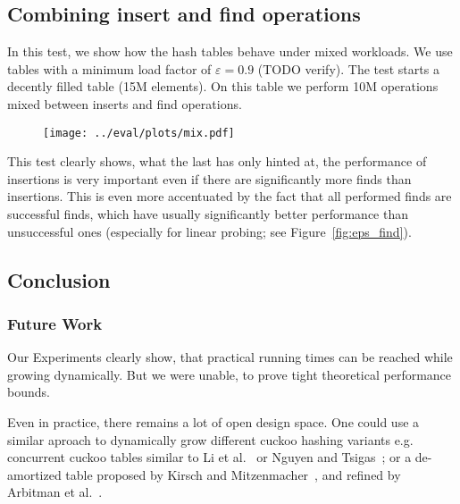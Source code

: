 \documentclass[a4paper,UKenglish]{lipics-v2016}
\begin{document}
\subsection{Combining insert and find operations}
\label{sec:exp_mix}
In this test, we show how the hash tables behave under mixed
workloads.  We use tables with a minimum load factor of $\varepsilon =
0.9$ (TODO verify).  The test starts a decently filled table
(15M elements).  On this table we perform 10M operations mixed between inserts and
find operations.

\begin{figure}[ht]
  \centering
  \texttt{[image: ../eval/plots/mix.pdf]}
  \caption{\label{fig:mix} }
\end{figure}

This test clearly shows, what the last has only hinted at, the
performance of insertions is very important even if there are
significantly more finds than insertions.  This is even more
accentuated by the fact that all performed finds are successful finds,
which have usually significantly better performance than unsuccessful
ones (especially for linear probing; see Figure~\ref{fig:eps_find}).

\subsection{Conclusion}
\subsubsection*{Future Work}
Our Experiments clearly show, that practical running times can be
reached while growing dynamically.  But we were unable, to prove tight
theoretical performance bounds.

Even in practice, there remains a lot of open design space.  One could
use a similar aproach to dynamically grow different cuckoo hashing
variants e.g. concurrent cuckoo tables similar to Li et
al.~\cite{AlgorithmicImprovementsForFastConcurrentCuckooHashing} or
Nguyen and Tsigas~\cite{LockFreeCuckooHashing}; or a de-amortized
table proposed by Kirsch and
Mitzenmacher~\cite{UsingAQueueToDeamortizeCuckooHashingInHardware},
and refined by Arbitman et
al.~\cite{DeAmortizedCuckooHashingProvableWorstCasePerformanceAndExperimentalResults}.





\end{document}
